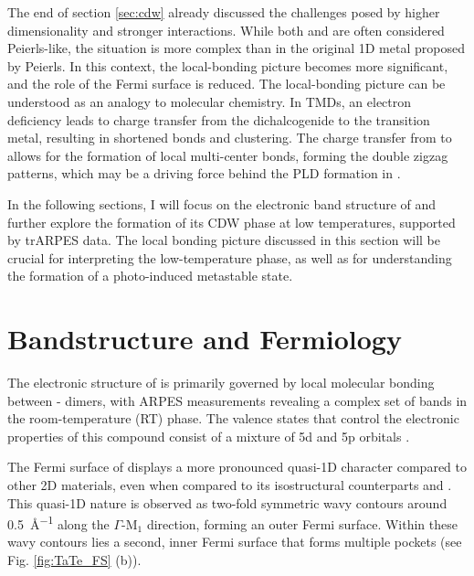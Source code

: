 The end of section \ref{sec:cdw} already discussed the challenges posed by higher dimensionality and stronger interactions.
While both  and  are often considered Peierls-like, the situation is more complex than in the original 1D metal proposed by Peierls.
In this context, the local-bonding picture becomes more significant, and the role of the Fermi surface is reduced.
The local-bonding picture can be understood as an analogy to molecular chemistry.
In TMDs, an electron deficiency leads to charge transfer from the dichalcogenide to the transition metal, resulting in shortened bonds and clustering.
The charge transfer from  to  allows for the formation of local multi-center bonds, forming the double zigzag patterns, which may be a driving force behind the PLD formation in  \cite{pouget_structural_2024, whangbo_analogies_1992, canadell_importance_1992, albright_thomas_a_orbital_2013}.

In the following sections, I will focus on the electronic band structure of  and further explore the formation of its CDW phase at low temperatures, supported by trARPES data.
The local bonding picture discussed in this section will be crucial for interpreting the low-temperature phase, as well as for understanding the formation of a photo-induced metastable state.

\section{Bandstructure and Fermiology}

The electronic structure of  is primarily governed by local molecular bonding between - dimers, with ARPES measurements revealing a complex set of bands in the room-temperature (RT) phase.
The valence states that control the electronic properties of this compound consist of a mixture of  5d and  5p orbitals \cite{mitsuishi_unveiling_2024}.

The Fermi surface of  displays a more pronounced quasi-1D character compared to other 2D materials, even when compared to its isostructural counterparts  and  \cite{lin_evidence_2022}.
This quasi-1D nature is observed as two-fold symmetric wavy contours around \qty{0.5}{\angstrom^{-1}} along the $\Gamma$-M$_1$ direction, forming an outer Fermi surface.
Within these wavy contours lies a second, inner Fermi surface that forms multiple pockets (see Fig. \ref{fig:TaTe_FS} (b)).


